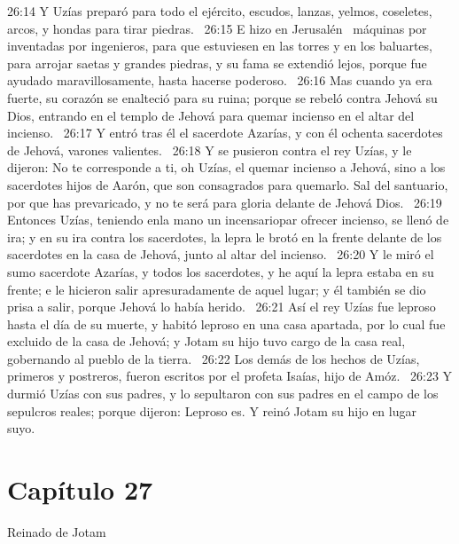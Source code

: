 																										26:14 Y Uzías preparó para todo el ejército, escudos, lanzas, yelmos, coseletes, arcos, y hondas para tirar piedras.  
																										26:15 E hizo en Jerusalén  máquinas por inventadas por ingenieros, para que estuviesen en las torres y en los baluartes, para arrojar saetas y grandes piedras, y su fama se extendió lejos, porque fue ayudado maravillosamente, hasta hacerse poderoso.  
																										26:16 Mas cuando ya era fuerte, su corazón se enalteció para su ruina; porque se rebeló contra Jehová su Dios, entrando en el templo de Jehová para quemar incienso en el altar del incienso.  
																										26:17 Y entró tras él el sacerdote Azarías, y con él ochenta sacerdotes de Jehová, varones valientes.  
																										26:18 Y se pusieron contra el rey Uzías, y le dijeron: No te corresponde a ti, oh Uzías, el quemar incienso a Jehová, sino a los sacerdotes hijos de Aarón, que son consagrados para quemarlo. Sal del santuario, por que has prevaricado, y no te será para gloria delante de Jehová Dios.  
																										26:19 Entonces Uzías, teniendo enla mano un incensariopar ofrecer incienso, se llenó de ira; y en su ira contra los sacerdotes, la lepra le brotó en la frente delante de los sacerdotes en la casa de Jehová, junto al altar del incienso.  
																										26:20 Y le miró el sumo sacerdote Azarías, y todos los sacerdotes, y he aquí la lepra estaba en su frente; e le hicieron salir apresuradamente de aquel lugar; y él también se dio prisa a salir, porque Jehová lo había herido.  
																										26:21 Así el rey Uzías fue leproso hasta el día de su muerte, y habitó leproso en una casa apartada, por lo cual fue excluido de la casa de Jehová; y Jotam su hijo tuvo cargo de la casa real, gobernando al pueblo de la tierra.  
																										26:22 Los demás de los hechos de Uzías, primeros y postreros, fueron escritos por el profeta Isaías, hijo de Amóz.  
																										26:23 Y durmió Uzías con sus padres, y lo sepultaron con sus padres en el campo de los sepulcros reales; porque dijeron: Leproso es. Y reinó Jotam su hijo en lugar suyo.  
																										\section*{Capítulo 27}
																											Reinado de Jotam  
																											
